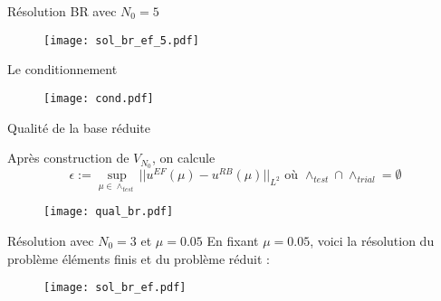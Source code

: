 \documentclass[10pt]{beamer}
\begin{document}

\begin{frame}{Résolution BR avec $N_0 = 5$}
\begin{figure}
\begin{center}
\texttt{[image: sol\_br\_ef\_5.pdf]}
\end{center}
\end{figure}

\end{frame}


\begin{frame}{Le conditionnement}

\begin{figure}[H] 
\begin{center}
\texttt{[image: cond.pdf]}
\end{center}
\end{figure}

\end{frame}

\begin{frame}{Qualité de la base réduite}

\noindent Après construction de $V_{N_{0}}$, on calcule  $$ \epsilon := \underset{\mu  \in  \wedge_{test}} {\sup}||u^{EF}(\mu) - u^{RB}(\mu) ||_{L^{2}} \text{ où }\wedge_{test} \cap \wedge_{trial} =  \emptyset $$

\begin{figure}
\begin{center}
\texttt{[image: qual\_br.pdf]}
\end{center}
\end{figure}

\end{frame}



\begin{frame}{Résolution avec $N_0 = 3$ et $\mu = 0.05$}
En fixant $\mu = 0.05$, voici la résolution du problème éléments finis et du problème réduit :

\begin{figure}
\begin{center}
\texttt{[image: sol\_br\_ef.pdf]}
\end{center}
\end{figure}



\end{frame}
\end{document}
